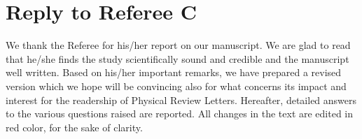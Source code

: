 \documentclass[12pt,english]{article}
\begin{document}


\section*{Reply to Referee C}
We thank the Referee for his/her report on our manuscript.
We are glad to read that he/she finds the study scientifically sound and credible and 
the manuscript well written. Based on his/her important remarks, we have 
prepared a revised version which we hope will be convincing also for what concerns
its impact and interest for the readership of Physical Review Letters.
Hereafter, detailed answers to the various questions raised are reported. All changes 
in the text are edited in red color, for the sake of clarity.
\end{document}
